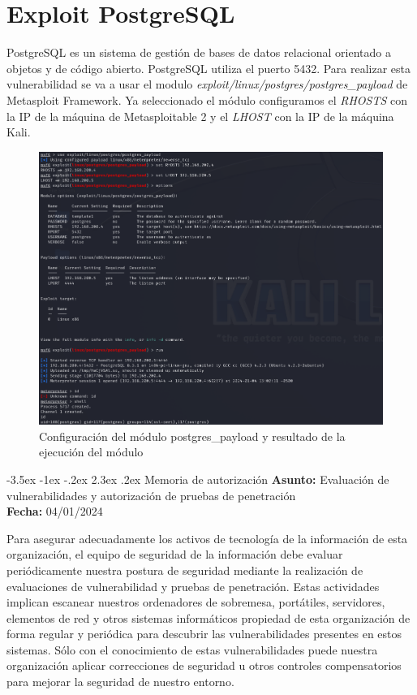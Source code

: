 \documentclass[11pt]{report}
\makeatletter
\renewcommand\chapter{\@startsection{chapter}{0}{\z@}%
    {-3.5ex \@plus -1ex \@minus -.2ex}%
    {2.3ex \@plus.2ex}%
    {\normalfont\Large\bfseries}}
\makeatother
\begin{document}
\section{Exploit PostgreSQL}
PostgreSQL es un sistema de gestión de bases de datos relacional orientado a objetos y de código abierto. PostgreSQL utiliza el puerto 5432. Para realizar esta vulnerabilidad
se va a usar el modulo \emph{exploit/linux/postgres/postgres\_payload} de Metasploit Framework. Ya seleccionado el módulo configuramos el \emph{RHOSTS} con la IP de la máquina de Metasploitable 2 y
el \emph{LHOST} con la IP de la máquina Kali.
\begin{figure}[H]
  \centering
  \includegraphics[scale=0.65]{img/postgresql.png}
  \caption{Configuración del módulo postgres\_payload y resultado de la ejecución del módulo}
\end{figure}


\newpage

\chapter{Memoria de autorización}
\textbf{Asunto:} Evaluación de vulnerabilidades y autorización de pruebas de penetración \\
\textbf{Fecha:} 04/01/2024 

Para asegurar adecuadamente los activos de tecnología de la información de esta organización, el equipo de seguridad de la información debe evaluar periódicamente nuestra postura de seguridad mediante la realización de evaluaciones de vulnerabilidad y pruebas de penetración. Estas actividades implican escanear nuestros ordenadores de sobremesa, portátiles, servidores, elementos de red y otros sistemas informáticos propiedad de esta organización de forma regular y periódica para descubrir las vulnerabilidades presentes en estos sistemas. Sólo con el conocimiento de estas vulnerabilidades puede nuestra organización aplicar correcciones de seguridad u otros controles compensatorios para mejorar la seguridad de nuestro entorno.
\end{document}
